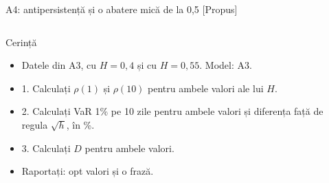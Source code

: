 \begin{frame}{A4: antipersistență și o abatere mică de la 0,5 [Propus]}
\propsub
\itemsize{\scriptsize}
\begin{columns}[T]
\begin{column}{\taskw}
\begin{block}{Cerință}
\begin{itemize}
    \item Datele din A3, cu $H = 0{,}4$ și cu $H = 0{,}55$. Model: A3.
    \item 1. Calculați $\rho(1)$ și $\rho(10)$ pentru ambele valori ale lui $H$.
    \item 2. Calculați VaR 1\% pe 10 zile pentru ambele valori și diferența față de regula $\sqrt{h}$, în \%.
    \item 3. Calculați $D$ pentru ambele valori.
    \item Raportați: opt valori și o frază.
\end{itemize}
\end{block}
\end{column}
\begin{column}{\solw}
\end{column}
\end{columns}
\end{frame}

